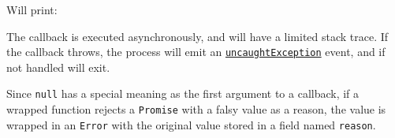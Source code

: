 \begin{Shaded}
\begin{Highlighting}[]
\OperatorTok{=} \NormalTok{(}\NormalTok{)}\OperatorTok{;}

  \NormalTok{() \{}
   \OperatorTok{;}
\NormalTok{\}}
\OperatorTok{=}\OperatorTok{;}

\OperatorTok{,}\KeywordTok{=\textgreater{}}\NormalTok{ \{}
  \OperatorTok{;}
  \OperatorTok{;}
\NormalTok{\})}\OperatorTok{;}
\end{Highlighting}
\end{Shaded}

Will print:

\begin{Shaded}
\begin{Highlighting}[]
\end{Highlighting}
\end{Shaded}

The callback is executed asynchronously, and will have a limited stack
trace. If the callback throws, the process will emit an
\href{process.md\#event-uncaughtexception}{\texttt{\textquotesingle{}uncaughtException\textquotesingle{}}}
event, and if not handled will exit.

Since \texttt{null} has a special meaning as the first argument to a
callback, if a wrapped function rejects a \texttt{Promise} with a falsy
value as a reason, the value is wrapped in an \texttt{Error} with the
original value stored in a field named \texttt{reason}.

